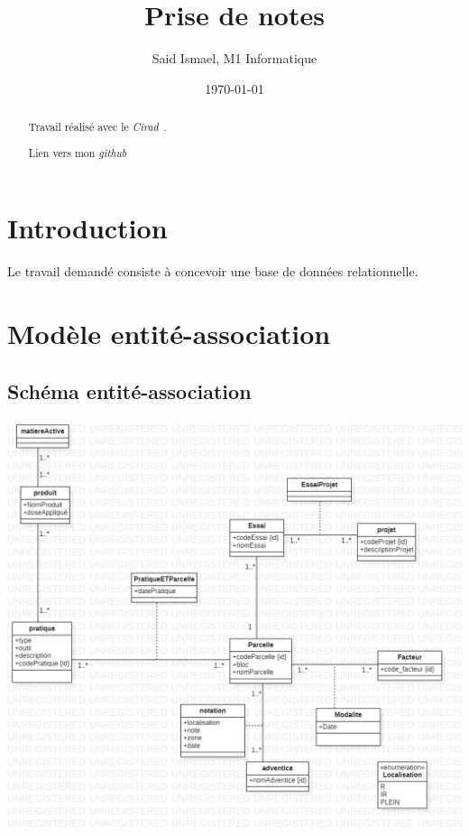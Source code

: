 \documentclass{article}
\title{Prise de notes}
\author{Said Ismael, M1 Informatique}
\date{\today}
\begin{document}
\maketitle %


\newpage
\thispagestyle{empty}
\mbox{}
\newpage




\tableofcontents
\newpage



\begin{abstract}
  Travail réalisé avec le \textit{Cirad}~\cite{coursera}.


  Lien vers mon \textit{github}~\cite{github}
\end{abstract}


\section{Introduction}
Le travail demandé consiste à concevoir une base de données relationnelle.
\section{Modèle entité-association}
\subsection{Schéma entité-association}
\includegraphics[scale=0.35]{Main.jpg}
\end{document}
